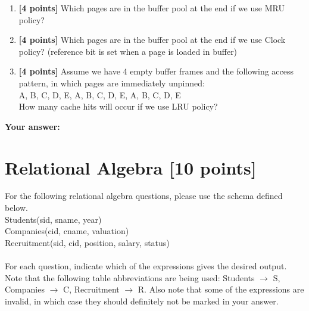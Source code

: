 \documentclass[10pt]{article}
\begin{document}
\begin{enumerate}
	\item \textbf{[4 points]}
	      Which pages are in the buffer pool at the end if we use MRU policy?   \\


	\item \textbf{[4 points]}
	      Which pages are in the buffer pool at the end if we use Clock policy? (reference bit is set when a page is loaded in buffer)  \\

	\item \textbf{[4 points]}
	      Assume we have 4 empty buffer frames and the following access pattern, in which pages are immediately unpinned: \\
	      A, B, C, D, E, A, B, C, D, E, A, B, C, D, E \\
	      How many cache hits will occur if we use LRU policy?

\end{enumerate}
\textbf{Your answer:}



\newpage
\section{Relational Algebra \textbf{[10 points]}}
For the following relational algebra questions, please use the schema
defined below.\\

Students(sid, sname, year) \\

Companies(cid, cname, valuation) \\

Recruitment(sid, cid, position, salary, status) \\
\\
For each question, indicate which of the expressions gives the desired
output. Note that the following table abbreviations are being used:
Students $\rightarrow$ S, Companies $\rightarrow$ C, Recruitment
$\rightarrow$ R. Also note that some of the expressions are invalid,
in which case they should definitely not be marked in your answer.
\end{document}
